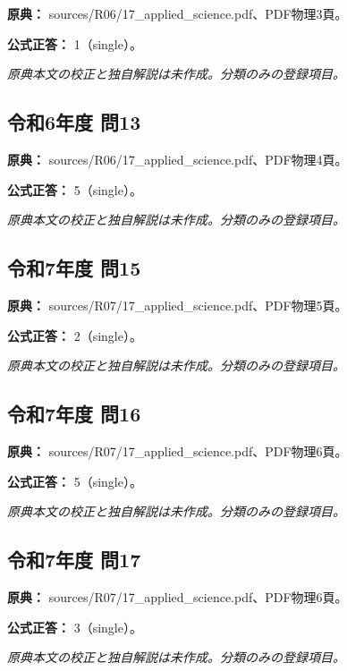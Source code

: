 \noindent\textbf{原典：} sources/R06/17\_applied\_science.pdf、PDF物理3頁。

\textbf{公式正答：} 1（single）。

\par\textit{原典本文の校正と独自解説は未作成。分類のみの登録項目。}

\subsection{令和6年度 問13}
\label{q:r06-reg-applied-13}

\noindent\textbf{原典：} sources/R06/17\_applied\_science.pdf、PDF物理4頁。

\textbf{公式正答：} 5（single）。

\par\textit{原典本文の校正と独自解説は未作成。分類のみの登録項目。}

\subsection{令和7年度 問15}
\label{q:r07-reg-applied-15}

\noindent\textbf{原典：} sources/R07/17\_applied\_science.pdf、PDF物理5頁。

\textbf{公式正答：} 2（single）。

\par\textit{原典本文の校正と独自解説は未作成。分類のみの登録項目。}

\subsection{令和7年度 問16}
\label{q:r07-reg-applied-16}

\noindent\textbf{原典：} sources/R07/17\_applied\_science.pdf、PDF物理6頁。

\textbf{公式正答：} 5（single）。

\par\textit{原典本文の校正と独自解説は未作成。分類のみの登録項目。}

\subsection{令和7年度 問17}
\label{q:r07-reg-applied-17}

\noindent\textbf{原典：} sources/R07/17\_applied\_science.pdf、PDF物理6頁。

\textbf{公式正答：} 3（single）。

\par\textit{原典本文の校正と独自解説は未作成。分類のみの登録項目。}
